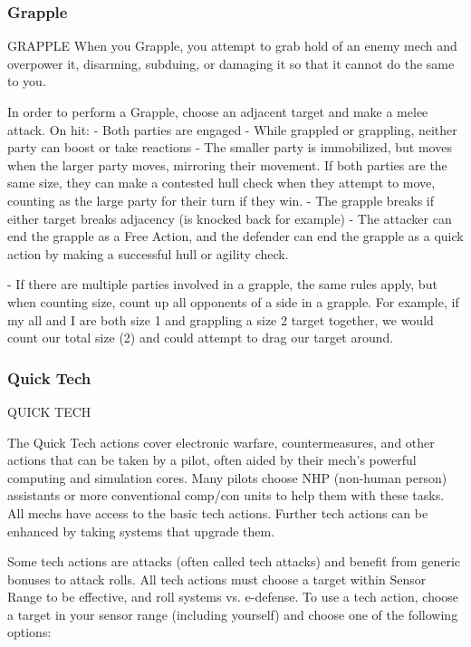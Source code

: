 \subsubsection{Grapple}

                                              GRAPPLE
When you Grapple, you attempt to grab hold of an enemy mech and overpower it, disarming,
subduing, or damaging it so that it cannot do the same to you.

In order to perform a Grapple, choose an adjacent target and make a melee attack. On hit:
    -   Both parties are engaged
    -   While grappled or grappling, neither party can boost or take reactions
    -   The smaller party is immobilized, but moves when the larger party moves, mirroring their
        movement. If both parties are the same size, they can make a contested hull check when
        they attempt to move, counting as the large party for their turn if they win.
    -   The grapple breaks if either target breaks adjacency (is knocked back for example)
    -   The attacker can end the grapple as a Free Action, and the defender can end the grapple
        as a quick action by making a successful hull or agility check.




    -    If there are multiple parties involved in a grapple, the same rules apply, but when counting
         size, count up all opponents of a side in a grapple. For example, if my all and I are both
         size 1 and grappling a size 2 target together, we would count our total size (2) and could
         attempt to drag our target around.

\subsubsection{Quick Tech}

                                              QUICK TECH

The Quick Tech actions cover electronic warfare, countermeasures, and other actions that can
be taken by a pilot, often aided by their mech’s powerful computing and simulation cores. Many
pilots choose NHP (non-human person) assistants or more conventional comp/con units to help
them with these tasks. All mechs have access to the basic tech actions. Further tech actions can
be enhanced by taking systems that upgrade them.


Some tech actions are attacks (often called tech attacks) and benefit from generic bonuses to
attack rolls. All tech actions must choose a target within Sensor Range to be effective, and roll
systems vs. e-defense. To use a tech action, choose a target in your sensor range (including
yourself) and choose one of the following options:



